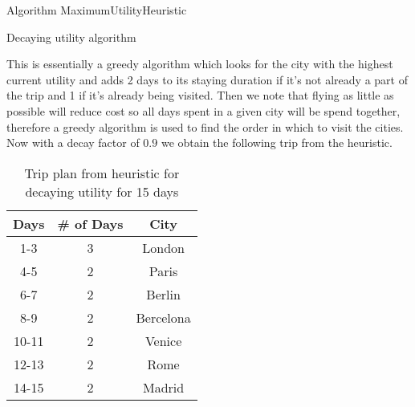 \documentclass[12pt]{article}
\begin{document}
\begin{algorithm}[h!]
\begin{algorithmic}[1]
\STATE Algorithm MaximumUtilityHeuristic
	\ELSE
	\ENDIF
\ENDWHILE
{}
\ENDWHILE
{}
\end{algorithmic}
\caption{Decaying utility algorithm}
\label{alg:bstSearch}
\end{algorithm}
This is essentially a greedy algorithm which looks for the city with the highest current utility and adds 2 days to its staying duration if it's not already a part of the trip and 1 if it's already being visited. Then we note that flying as little as possible will reduce cost so all days spent in a given city will be spend together, therefore a greedy algorithm is used to find the order in which to visit the cities. Now with a decay factor of $0.9$ we obtain the following trip from the heuristic.
\begin{table}[h!]
\caption{Trip plan from heuristic for decaying utility for 15 days}
\centering
\begin{tabular}{c|c|c}
	\hline
	\rule{0pt}{2ex} Days & \# of Days & City \\
	\hline
	1-3 & 3 & London \\
	4-5 & 2 & Paris \\
	6-7 & 2 & Berlin \\
	8-9 & 2 & Bercelona \\
	10-11 & 2 & Venice \\
	12-13 & 2 & Rome \\
	14-15 & 2 & Madrid \\
	\hline
\end{tabular}
\vspace{1mm}
\end{table}\\
\end{document}
